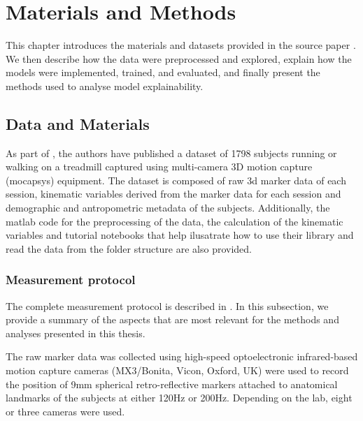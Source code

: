 \chapter{Materials and Methods}\label{chap:materials-methods}
This chapter introduces the materials and datasets provided in the source paper \citep{Ferber2024}. We then describe how the data were preprocessed and explored, explain how the models were implemented, trained, and evaluated, and finally present the methods used to analyse model explainability.

\section{Data and Materials}\label{sec:method-data-materials}
As part of \citet{Ferber2024}, the authors have published a dataset of 1798 \glspl{subject} running or walking on a treadmill captured using multi-camera 3D motion capture (\gls{mocapsys}) equipment. The dataset is composed of raw 3d marker data of each \gls{session}, kinematic variables derived from the marker data for each session and demographic and antropometric metadata of the subjects. Additionally, the matlab code for the preprocessing of the data, the calculation of the kinematic variables and tutorial notebooks that help ilusatrate how to use their library and read the data from the folder structure are also provided.

\subsection{Measurement protocol}\label{subsec:measurement-protocol}
The complete measurement protocol is described in \citet{Ferber2024}. In this subsection, we provide a summary of the aspects that are most relevant for the methods and analyses presented in this thesis.

The raw marker data was collected using high-speed optoelectronic infrared-based motion capture cameras (MX3/Bonita, Vicon, Oxford, UK) were used to record the position of 9mm spherical retro-reflective markers attached to anatomical landmarks of the subjects at either 120Hz or 200Hz. Depending on the lab, eight or three cameras were used.

